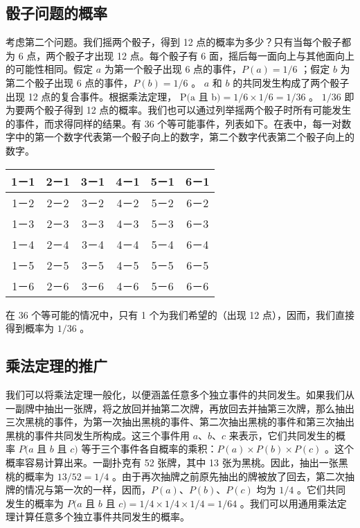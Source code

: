 \subsection{骰子问题的概率}

考虑第二个问题。我们摇两个骰子，得到 12 点的概率为多少？只有当每个骰子都为 6 点，两个骰子才出现 12 点。每个骰子有 6 面，摇后每一面向上与其他面向上的可能性相同。假定 $a$ 为第一个骰子出现 6 点的事件，$P(a)=1 / 6$ ；假定 $b$ 为第二个骰子出现 6 点的事件，$P(b)=1 / 6$ 。 $a$ 和 $b$ 的共同发生构成了两个骰子出现 12 点的复合事件。根据乘法定理， $\mathrm{P}(\mathrm{a}$ 且 b$)=1 / 6 \times 1 / 6=1 / 36$ 。 $1 / 36$ 即为要两个骰子得到 12 点的概率。我们也可以通过列举摇两个骰子时所有可能发生的事件，而求得同样的结果。有 36 个等可能事件，列表如下。在表中，每一对数字中的第一个数字代表第一个骰子向上的数字，第二个数字代表第二个骰子向上的数字。

\begin{center}
\begin{tabular}{|c|c|c|c|c|c|}
\hline
1－1 & 2－1 & 3－1 & 4－1 & 5－1 & 6－1 \\
\hline
1－2 & 2－2 & 3－2 & 4－2 & 5－2 & 6－2 \\
\hline
1－3 & 2－3 & 3－3 & 4－3 & 5－3 & 6－3 \\
\hline
1－4 & 2－4 & 3－4 & 4－4 & 5－4 & 6－4 \\
\hline
1－5 & 2－5 & 3－5 & 4－5 & 5－5 & 6－5 \\
\hline
1－6 & 2－6 & 3－6 & 4－6 & 5－6 & 6－6 \\
\hline
\end{tabular}
\end{center}

在 36 个等可能的情况中，只有 1 个为我们希望的（出现 12 点），因而，我们直接得到概率为 $1 / 36$ 。

\subsection{乘法定理的推广}

我们可以将乘法定理一般化，以便涵盖任意多个独立事件的共同发生。如果我们从一副牌中抽出一张牌，将之放回并抽第二次牌，再放回去并抽第三次牌，那么抽出三次黑桃的事件，为第一次抽出黑桃的事件、第二次抽出黑桃的事件和第三次抽出黑桃的事件共同发生所构成。这三个事件用 $a$、$b$、$c$ 来表示，它们共同发生的概率 $P(a$ 且 $b$ 且 $c)$ 等于三个事件各自概率的乘积：$P(a) \times P(b) \times P(c)$ 。这个概率容易计算出来。一副扑克有 52 张牌，其中 13 张为黑桃。因此，抽出一张黑桃的概率为 $13 / 52=1 / 4$ 。由于再次抽牌之前原先抽出的牌被放了回去，第二次抽牌的情况与第一次的一样，因而，$P(a)$、$P(b)$、$P(c)$ 均为 $1 / 4$ 。它们共同发生的概率为 $P(a$ 且 $b$ 且 $c)=1 / 4 \times 1 / 4 \times 1 / 4=1 / 64$ 。我们可以用通用乘法定理计算任意多个独立事件共同发生的概率。

